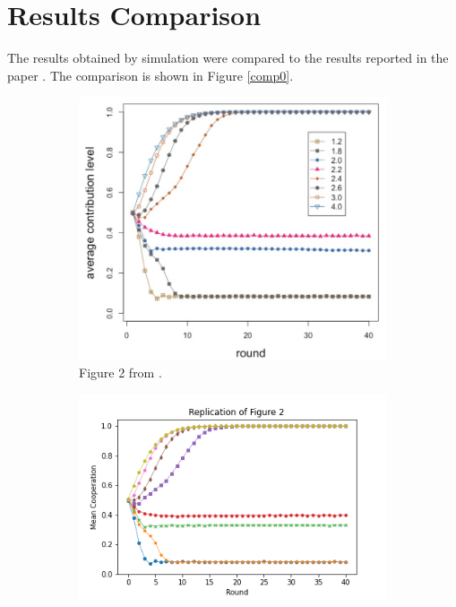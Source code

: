 \section{Results Comparison}
The results obtained by simulation were compared to the results reported in the paper \cite{RN49}. The comparison is shown in Figure \ref{comp0}. \\

\FloatBarrier 
\begin{figure}[!h]
  \begin{subfigure}[b]{0.45\textwidth}
    \includegraphics[width=\textwidth]{images/TAfig2_real.png}
    \caption{Figure 2 from \cite{RN49}. }
    \label{TAfig2_real}
  \end{subfigure}
  \hfill
  \begin{subfigure}[b]{0.45\textwidth}
    \includegraphics[width=1.25\textwidth]{images/TAfig2.png}

\end{subfigure}
\end{figure}
